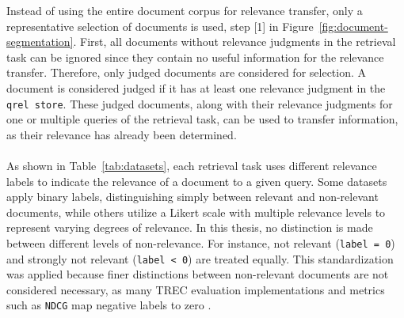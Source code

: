 Instead of using the entire document corpus for relevance transfer, only a representative selection of documents is used, step [1] in Figure~\ref{fig:document-segmentation}. First, all documents without relevance judgments in the retrieval task can be ignored since they contain no useful information for the relevance transfer. Therefore, only judged documents are considered for selection. A document is considered judged if it has at least one relevance judgment in the \texttt{qrel store}. These judged documents, along with their relevance judgments for one or multiple queries of the retrieval task, can be used to transfer information, as their relevance has already been determined.
\\\\
As shown in Table~\ref{tab:datasets}, each retrieval task uses different relevance labels to indicate the relevance of a document to a given query. Some datasets apply binary labels, distinguishing simply between relevant and non-relevant documents, while others utilize a Likert scale with multiple relevance levels to represent varying degrees of relevance. In this thesis, no distinction is made between different levels of non-relevance. For instance, \glqq not relevant\grqq{} (\texttt{label = 0}) and \glqq strongly not relevant\grqq{} (\texttt{label < 0}) are treated equally. This standardization was applied because finer distinctions between non-relevant documents are not considered necessary, as many TREC evaluation implementations and metrics such as \texttt{NDCG} map negative labels to zero \citep{gienapp:2020}.
